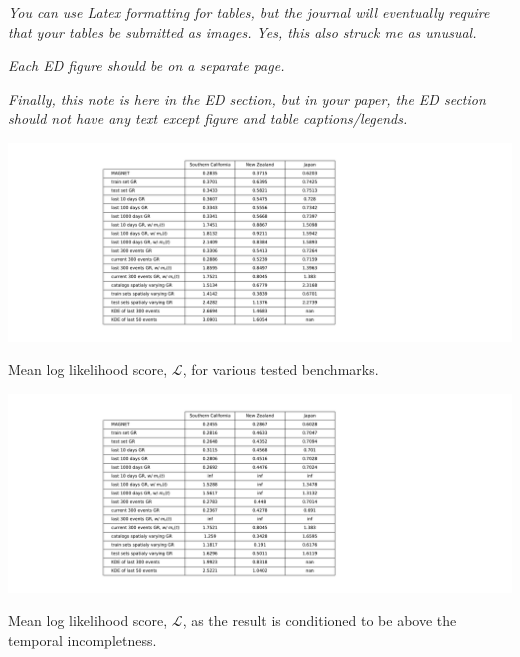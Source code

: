 \documentclass[pdflatex]{sn-jnl}
\begin{document}
\textit{You can use Latex formatting for tables, but the journal will eventually require that your tables be submitted as images. Yes, this also struck me as unusual.}

\textit{Each ED figure should be on a separate page.}

\textit{Finally, this note is here in the ED section, but in your paper, the ED section should not have any text except figure and table captions/legends.}

\newpage
\begin{table}[h!]
    \centering
    \includegraphics[width=1\textwidth]{figures/mean_ll_table.pdf}
    \caption{Mean log likelihood score, $\mathcal{L}$, for various tested benchmarks.}
    \label{tab:mean_ll_all_benchmarks}
\end{table}


\newpage
\begin{table}[h!]
    \centering
    \includegraphics[width=1\textwidth]{figures/mean_ll_cond_table.pdf}
    \caption{Mean log likelihood score, $\mathcal{L}$, as the result is conditioned to be above the temporal incompletness.}
    \label{tab:mean_ll_all_benchmarks_conditioned}
\end{table}
\end{document}
